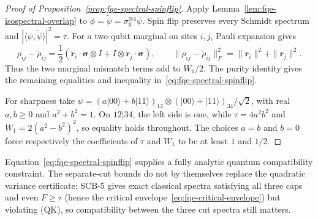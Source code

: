\begin{proof}[Proof of Proposition~\ref{prop:fqe-spectral-spinflip}]
Apply Lemma~\ref{lem:fqe-isospectral-overlap} to
$\phi=\widetilde\psi=\sigma_y^{\otimes4}\overline\psi$.
Spin flip preserves every Schmidt spectrum and
$|\langle\psi,\widetilde\psi\rangle|^2=\tau$.
For a two-qubit marginal on sites $i,j$, Pauli expansion gives
\[
 \rho_{ij}-\widetilde\rho_{ij}
 =\frac12\left(\mathbf r_i\cdot\boldsymbol\sigma\otimes I
              +I\otimes\mathbf r_j\cdot\boldsymbol\sigma\right),
 \qquad
 \|\rho_{ij}-\widetilde\rho_{ij}\|_F^2
 =\|\mathbf r_i\|^2+\|\mathbf r_j\|^2.
\]
Thus the two marginal mismatch terms add to $W_1/2$.
The purity identity gives the remaining equalities and inequality
in~\eqref{eq:fqe-spectral-spinflip}.

For sharpness take
$\psi=(a|00\rangle+b|11\rangle)_{12}\otimes
(|00\rangle+|11\rangle)_{34}/\sqrt2$, with real $a,b\ge0$ and
$a^2+b^2=1$. On $12|34$, the left side is one, while
$\tau=4a^2b^2$ and $W_1=2(a^2-b^2)^2$, so equality holds throughout.
The choices $a=b$ and $b=0$ force respectively the coefficients of
$\tau$ and $W_1$ to be at least $1$ and $1/2$.
\end{proof}

Equation~\eqref{eq:fqe-spectral-spinflip} supplies a fully analytic quantum
compatibility constraint. The separate-cut bounds do not by themselves
replace the quadratic variance certificate: SCB-5 gives exact classical spectra
satisfying all three caps and even $F\ge\tau$ (hence the critical
envelope~\eqref{eq:fqe-critical-envelope}) but violating (QK), so compatibility
between the three cut spectra still matters.

